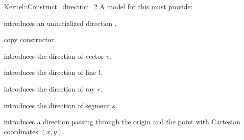 \begin{ccRefFunctionObjectConcept}{Kernel::Construct_direction_2}
A model for this must provide:



\ccHidden {}
             {introduces an uninitialized direction .}

\ccHidden {}
            {copy constructor.}

            {introduces the direction of vector $v$.}

            {introduces the direction of line $l$.}

            {introduces the direction of ray $r$.}

            {introduces the direction of segment $s$.}

\ccHidden{}
            {introduces a direction  passing through the origin
             and the point with Cartesian coordinates $(x, y)$.}

\end{ccRefFunctionObjectConcept}
